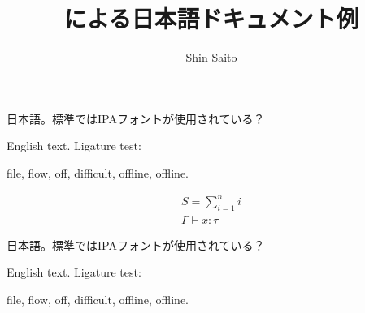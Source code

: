 \documentclass[xelatex,ja=standard,a4paper]{bxjsarticle}
\title{\XeLaTeX による日本語ドキュメント例}
\author{Shin Saito}
\begin{document}
\maketitle
日本語。標準ではIPAフォントが使用されている？

English text. Ligature test:

{\LARGE file, flow, off, difficult, offline, off\/line.}

\begin{gather*}
    S = \sum_{i=1}^n i \\
    \Gamma \vdash x \colon \tau
\end{gather*}

\sffamily
日本語。標準ではIPAフォントが使用されている？

English text. Ligature test:

{\LARGE file, flow, off, difficult, offline, off\/line.}
\end{document}
